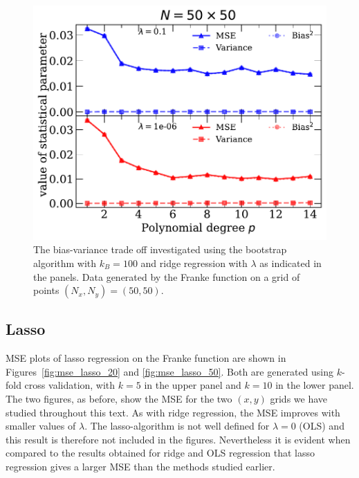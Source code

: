 \documentclass[a4paper, 
amsfonts, 
amssymb, 
amsmath, 
reprint, 
showkeys, 
nofootinbib, 
twoside]{revtex4-2}
\begin{document}
\begin{figure}
    \centering
    \includegraphics[width = \columnwidth]{Figures/biasvar_ridge_n50.pdf}
    \caption{The bias-variance trade off investigated using the bootstrap algorithm with $k_B = 100$ and ridge regression with $\lambda$ as indicated in the panels. Data generated by the Franke function on a grid of points $(N_x, N_y) = (50,50)$.}
    \label{fig:bivar_ridge_50}
\end{figure}

\subsection{Lasso}

MSE plots of lasso regression on the Franke function are shown in Figures~\ref{fig:mse_lasso_20} and \ref{fig:mse_lasso_50}. Both are generated using $k$-fold cross validation, with $k = 5$ in the upper panel and $k = 10$ in the lower panel. The two figures, as before, show the MSE for the two $(x,y)$ grids we have studied throughout this text. As with ridge regression, the MSE improves with smaller values of $\lambda$. The lasso-algorithm is not well defined for $\lambda = 0$ (OLS) and this result is therefore not included in the figures. Nevertheless it is evident when compared to the results obtained for ridge and OLS regression that lasso regression gives a larger MSE than the methods studied earlier. 
\end{document}

